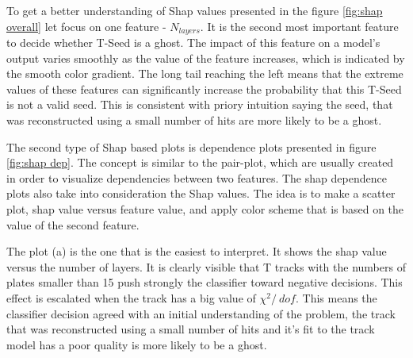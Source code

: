 To get a better understanding of Shap values presented in the figure \ref{fig:shap overall} let focus on one feature - $N_{layers}$. It is the second most important feature to decide whether T-Seed is a ghost. The impact of this feature on a model's output varies smoothly as the value of the feature increases, which is indicated by the smooth color gradient. The long tail reaching the left means that the extreme values of these features can significantly increase the probability that this T-Seed is not a valid seed. This is consistent with priory intuition saying the seed, that was reconstructed using a small number of hits are more likely to be a ghost. 

The second type of Shap based plots is dependence plots presented in figure \ref{fig:shap dep}.  The concept is similar to the pair-plot, which are usually created in order to visualize dependencies between two features. The shap dependence plots also take into consideration the Shap values. The idea is to make a scatter plot, shap value versus feature value, and apply color scheme that is based on the value of the second feature.

The plot (a) is the one that is the easiest to interpret. It shows the shap value versus the number of layers. It is clearly visible that T tracks with the numbers of plates smaller than 15 push strongly the classifier toward negative decisions. This effect is escalated when the track has a big value of $\chi^2 /\ dof $. This means the classifier decision agreed with an initial understanding of the problem, the track that was reconstructed using a small number of hits and it's fit to the track model has a poor quality is more likely to be a ghost. 


